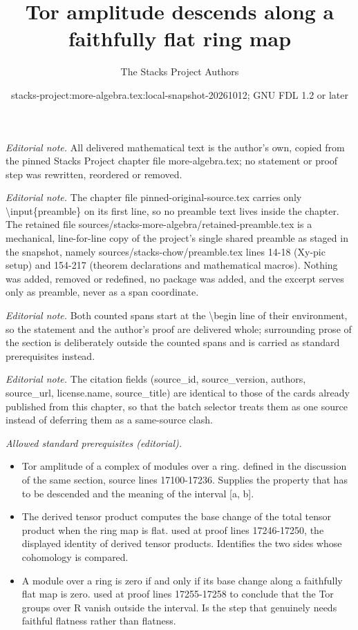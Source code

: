 \documentclass[10pt,a4paper]{amsart}
\title{Tor amplitude descends along a faithfully flat ring map}
\author{The Stacks Project Authors}
\date{stacks-project:more-algebra.tex:local-snapshot-20261012; GNU FDL 1.2 or later}
\theoremstyle{plain}
\theoremstyle{definition}
\theoremstyle{remark}
\numberwithin{equation}{subsection}
\begin{document}
\maketitle
\setcounter{subsection}{1}
\noindent\textit{Editorial note.} All delivered mathematical text is the author's own, copied from the pinned Stacks Project chapter file more-algebra.tex; no statement or proof step was rewritten, reordered or removed.\par\medskip
\noindent\textit{Editorial note.} The chapter file pinned-original-source.tex carries only \textbackslash{}input\{preamble\} on its first line, so no preamble text lives inside the chapter. The retained file sources/stacks-more-algebra/retained-preamble.tex is a mechanical, line-for-line copy of the project's single shared preamble as staged in the snapshot, namely sources/stacks-chow/preamble.tex lines 14-18 (Xy-pic setup) and 154-217 (theorem declarations and mathematical macros). Nothing was added, removed or redefined, no package was added, and the excerpt serves only as preamble, never as a span coordinate.\par\medskip
\noindent\textit{Editorial note.} Both counted spans start at the \textbackslash{}begin line of their environment, so the statement and the author's proof are delivered whole; surrounding prose of the section is deliberately outside the counted spans and is carried as standard prerequisites instead.\par\medskip
\noindent\textit{Editorial note.} The citation fields (source\_id, source\_version, authors, source\_url, license.name, source\_title) are identical to those of the cards already published from this chapter, so that the batch selector treats them as one source instead of deferring them as a same-source clash.\par\medskip
\noindent\textit{Allowed standard prerequisites (editorial).}\begin{itemize}
\item Tor amplitude of a complex of modules over a ring. defined in the discussion of the same section, source lines 17100-17236. Supplies the property that has to be descended and the meaning of the interval [a, b].
\item The derived tensor product computes the base change of the total tensor product when the ring map is flat. used at proof lines 17246-17250, the displayed identity of derived tensor products. Identifies the two sides whose cohomology is compared.
\item A module over a ring is zero if and only if its base change along a faithfully flat map is zero. used at proof lines 17255-17258 to conclude that the Tor groups over R vanish outside the interval. Is the step that genuinely needs faithful flatness rather than flatness.
\end{itemize}\medskip
\end{document}
